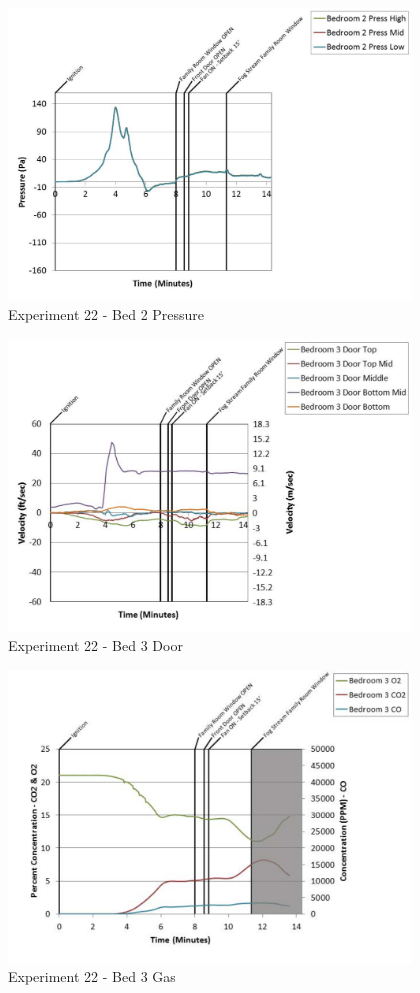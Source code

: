 \documentclass{article}
\begin{document}
\begin{appendices}
	\clearpage

	\begin{figure}[h!]
		\centering
		\includegraphics[height=3.05in]{0_Images/Results_Charts/Exp_22_Charts/Bed2Pressure.pdf}
		\caption{Experiment 22 - Bed 2 Pressure}
	\end{figure}
 

	\begin{figure}[h!]
		\centering
		\includegraphics[height=3.05in]{0_Images/Results_Charts/Exp_22_Charts/Bed3Door.pdf}
		\caption{Experiment 22 - Bed 3 Door}
	\end{figure}
 
	\clearpage

	\begin{figure}[h!]
		\centering
		\includegraphics[height=3.05in]{0_Images/Results_Charts/Exp_22_Charts/Bed3Gas.pdf}
		\caption{Experiment 22 - Bed 3 Gas}
	\end{figure}
 


\end{appendices}
\end{document}
